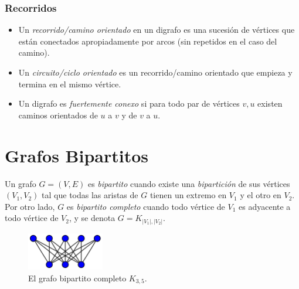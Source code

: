 \documentclass[a4paper]{report}
\begin{document}
\subsubsection{Recorridos}
\label{recorridos-digrafos}

\begin{itemize}
    \item Un \textit{recorrido/camino orientado} en un digrafo es una sucesión de vértices que están conectados apropiadamente por arcos (sin repetidos en el caso del camino).
    \item Un \textit{circuito/ciclo orientado} es un recorrido/camino orientado que empieza y termina en el mismo vértice.
    \item Un digrafo es \textit{fuertemente conexo} si para todo par de vértices $v, u$ existen caminos orientados de $u$ a $v$ y de $v$ a $u$.
\end{itemize}

\section{Grafos Bipartitos}

Un grafo $G = (V, E)$ es \textit{bipartito} cuando existe una \textit{bipartición} de sus vértices $(V_1, V_2)$ tal que todas las aristas de $G$ tienen un extremo en $V_1$ y el otro en $V_2$. Por otro lado, $G$ es \textit{bipartito completo} cuando todo vértice de $V_1$ es adyacente a todo vértice de $V_2$, y se denota $G = K_{|V_1|,|V_2|}$.

\begin{figure}[H]
    \centering
    \includegraphics[width=0.3\textwidth]{grafo_K_3,5.png}
    \caption*{El grafo bipartito completo $K_{3,5}$.}
\end{figure}
\end{document}
